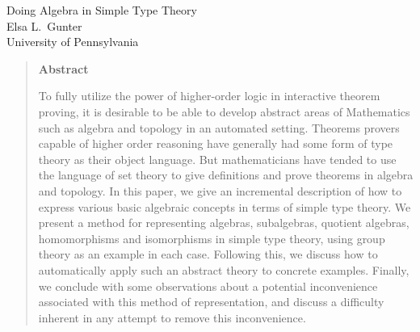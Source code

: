 

\def\baselinestretch{1.2}

\setlength{\textwidth}{6in}

\setlength{\topmargin}{0in}
\setlength{\textheight}{8.5in}

\pagestyle{myheadings}                       %
\markright{\ }                                 %

\reversemarginpar                            %



\sloppy
\thicklines
\setlength{\unitlength}{6em}




\newcommand{\mylabel}[1]{\label{#1}}
\newcommand{\myref}[1]{\ref{#1}}

\begin{center}
\LARGE 
Doing Algebra in Simple Type Theory\\
\normalsize
Elsa L.~Gunter\\
University of Pennsylvania\\
\date\\
\end{center}
\begin{quotation}
\begin{center} \bf Abstract \end{center}

To fully utilize the power of higher-order logic in interactive theorem
proving,  it is desirable to be able to develop abstract areas of Mathematics
such as algebra and topology in an automated setting.  Theorems provers
capable of higher order reasoning have generally had some form of type
theory as their object language.  But mathematicians have tended to use
the language of set theory to give definitions and prove theorems in
algebra and topology.  In this paper, we give an incremental description
of how to express various basic algebraic concepts in terms of simple type
theory.  We present a method for representing algebras, subalgebras,
quotient algebras, homomorphisms and isomorphisms in simple type theory, using
group theory as an example in each case.  Following this, we discuss how
to automatically apply such an abstract theory to concrete examples.
Finally, we conclude with some observations about a
potential inconvenience associated with this method of representation,
and discuss a difficulty inherent in any attempt to remove this
inconvenience.

\end{quotation}


